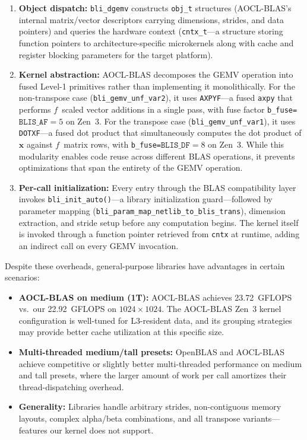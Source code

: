 \documentclass[conference]{IEEEtran}
\begin{document}
\begin{enumerate}
\item \textbf{Object dispatch:} \texttt{bli\_dgemv} constructs \texttt{obj\_t}
      structures (AOCL-BLAS's internal matrix/vector descriptors carrying dimensions,
      strides, and data pointers) and queries the hardware context
      (\texttt{cntx\_t}---a structure storing function pointers to
      architecture-specific microkernels along with cache and register blocking
      parameters for the target platform).
\item \textbf{Kernel abstraction:} AOCL-BLAS decomposes the GEMV operation into
      fused Level-1 primitives rather than implementing it monolithically.
      For the non-transpose case (\texttt{bli\_gemv\_unf\_var2}), it uses
      \texttt{AXPYF}---a fused \texttt{axpy} that performs $f$~scaled
      vector additions in a single pass, with fuse factor
      \texttt{b\_fuse=}$\texttt{BLIS\_AF}=5$ on Zen~3.
      For the transpose case (\texttt{bli\_gemv\_unf\_var1}), it uses
      \texttt{DOTXF}---a fused dot product that simultaneously computes
      the dot product of $\mathbf{x}$ against $f$~matrix rows, with
      \texttt{b\_fuse=}$\texttt{BLIS\_DF}=8$ on Zen~3.
      While this modularity enables code reuse across different BLAS operations,
      it prevents optimizations that span the entirety of the GEMV operation.
\item \textbf{Per-call initialization:} Every entry through the BLAS
      compatibility layer invokes \texttt{bli\_init\_auto()}---a library
      initialization guard---followed by parameter mapping
      (\texttt{bli\_param\_map\_netlib\_to\_blis\_trans}), dimension
      extraction, and stride setup before any computation begins. The
      kernel itself is invoked through a function pointer retrieved from
      \texttt{cntx} at runtime, adding an indirect call on every GEMV
      invocation.
\end{enumerate}

Despite these overheads, general-purpose libraries have advantages in certain
scenarios:

\begin{itemize}
\item \textbf{AOCL-BLAS on medium (1T):} AOCL-BLAS achieves 23.72~GFLOPS vs.\ our
      22.92~GFLOPS on $1024 \times 1024$. The AOCL-BLAS Zen~3 kernel configuration
      is well-tuned for L3-resident data, and its grouping strategies
      may provide better cache utilization at this specific size.
\item \textbf{Multi-threaded medium/tall presets:} OpenBLAS and AOCL-BLAS achieve
      competitive or slightly better multi-threaded performance on medium and
      tall presets, where the larger amount of work per call amortizes their
      thread-dispatching overhead.
\item \textbf{Generality:} Libraries handle arbitrary strides, non-contiguous
      memory layouts, complex alpha/beta combinations, and all transpose
      variants---features our kernel does not support.
\end{itemize}
\end{document}
